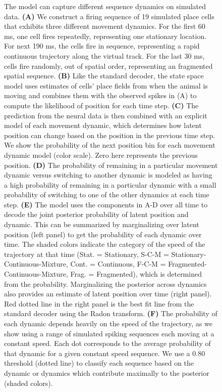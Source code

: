 \documentclass[9pt,lineno]{elife}
\begin{document}
\begin{figure}
\caption{The model can capture different sequence dynamics on simulated data. \textbf{(A)} We construct a firing sequence of 19 simulated place cells that exhibits three different movement dynamics. For the first 60 ms, one cell fires repeatedly, representing one stationary location. For next 190 ms, the cells fire in sequence, representing a rapid continuous trajectory along the virtual track. For the last 30 ms, cells fire randomly, out of spatial order, representing an fragmented spatial sequence. \textbf{(B)} Like the standard decoder, the state space model uses estimates of cells' place fields from when the animal is moving and combines them with the observed spikes in (A) to compute the likelihood of position for each time step. \textbf{(C)} The prediction from the neural data is then combined with an explicit model of each movement dynamic, which determines how latent position can change based on the position in the previous time step. We show the probability of the next position bin for each movement dynamic model (color scale). Zero here represents the previous position. \textbf{(D)} The probability of remaining in a particular movement dynamic versus switching to another dynamic is modeled as having a high probability of remaining in a particular dynamic with a small probability of switching to one of the other dynamics at each time step. \textbf{(E)} The model uses the components in A-D over all time to decode the joint posterior probability of latent position and dynamic. This can be summarized by marginalizing over latent position (left panel) to get the probability of each dynamic over time. The shaded colors indicate the category of the speed of the trajectory at that time (Stat. = Stationary, S-C-M = Stationary-Continuous-Mixture, Cont. = Continuous, F-C-M = Fragmented-Continuous-Mixture, Frag. = Fragmented), which is determined from the probability. Marginalizing the posterior across dynamics also provides an estimate of latent position over time (right panel). Red dotted line in the right panel is the best fit line from the standard decoder using the Radon transform. \textbf{(F)} The probability of each dynamic depends heavily on the speed of the trajectory, as we show using a range of simulated spiking sequences each moving at a constant speed. Each dot corresponds to the average probability of that dynamic for a given constant speed sequence. We use a 0.80 threshold (dotted line) to classify each sequence based on the dynamic or dynamics which contribute maximally to the posterior (shaded colors).
}
\label{fig:1}

\end{figure}
\end{document}
